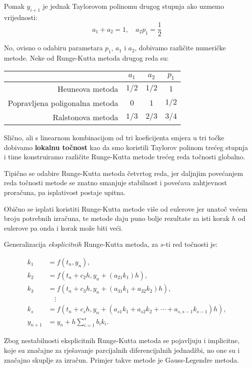 Pomak $y_{i+1}$ je jednak Taylorovom polinomu drugog stupnja ako uzmemo
vrijednosti:
$$
a_1 + a_2 = 1,\quad a_2 p_1 = \frac{1}{2}
$$

No, ovisno o odabiru parametara $p_1$, $a_1$ i $a_2$, dobivamo različite
numeričke metode. Neke od Runge-Kutta metoda drugog reda su:

\begin{center}
\begin{tabular}{r|c|c|c}
    & $a_1$ & $a_2$ & $p_1$\\
    \hline
    Heuneova metoda & $1/2$ & $1/2$ & $1$\\
    \hline
    Popravljena poligonalna metoda & $0$ & $1$ & $1/2$\\
    \hline
    Ralstonova metoda & $1/3$ & $2/3$ & $3/4$\\
\end{tabular}
\end{center}

Slično, ali s linearnom kombinacijom od tri koeficijenta smjera u tri točke
dobivamo \textbf{lokalnu točnost} kao da smo koristili Taylorov polinom trećeg
stupnja i time konstruiramo različite Runge-Kutta metode trećeg reda točnosti
globalno.

Tipično se odabire Runge-Kutta metoda četvrtog reda, jer daljnjim povećanjem
reda točnosti metode se znatno smanjuje stabilnost i povećava zahtjevnost
proračuna, pa isplativost postaje upitna.

Obično se isplati koristiti Runge-Kutta metode više od eulerove jer unatoč većem
broju potrebnih izračuna, te metode daju puno bolje rezultate za isti korak $h$
od eulerove pa onda i korak može biti veći.

Generalizacija \textit{eksplicitnih} Runge-Kutta metoda, za $s$-ti red točnosti je:

\begin{align*}
    k_1 & = f(t_n, y_n),\\
    k_2 & = f(t_n+c_2h, y_n+(a_{21}k_1)h),\\
    k_3 & = f(t_n+c_3h, y_n+(a_{31}k_1+a_{32}k_2)h),\\
        &\quad \vdots\\
    k_s & = f(t_n+c_sh, y_n+(a_{s1}k_1+a_{s2}k_2+\cdots+a_{s,s-1}k_{s-1})h),\\
    y_{n+1} &= y_n + h \sum_{i=1}^s b_i k_i.
\end{align*}

Zbog nestabilnosti eksplicitnih Runge-Kutta metoda se pojavljuju i implicitne,
koje su značajne za rješavanje parcijalnih diferencijalnih jednadžbi, no one su
i značajno skuplje za izračun. Primjer takve metode je Gauss-Legendre metoda.

